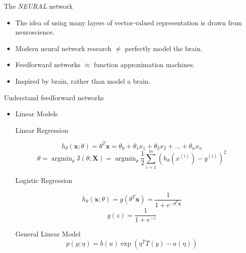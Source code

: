 \documentclass[10pt]{beamer}
\begin{document}
	\begin{frame}{The \emph{NEURAL} network}
		\begin{itemize}
			\pause
			\item The idea of using many layers of vector-valued representation is drawn from neuroscience.
			\pause
			\item Modern neural network research $\ne$ perfectly model the brain.
			\pause
			\item Feedforward networks $\approx$ function approximation machines.
			\pause
			\item Inspired by brain, rather than model a brain.
		\end{itemize}
	\end{frame}
	
	\begin{frame}{Understand feedforward networks}
		\begin{itemize}
			\pause
			\item Linear Models
			\pause
			\begin{exampleblock}{Linear Regression}
				\vspace{-2em}
				\begin{center}
					$$h_\theta(\bm{x};\theta)=\theta ^T\bm{x}=\theta_0+\theta_1x_1+\theta_2x_2+\dots+\theta_nx_n$$	
					\vspace{-2em}
					$$\theta=\mathop{\arg\min}_{\theta}\mathrm{J}(\theta;\bm{X})=\mathop{\arg\min}_{\theta}\frac{1}{2}\sum^{m}_{i=1}(h_\theta(x^{(i)})-y^{(i)})^2$$
					\vspace{-1em}
				\end{center}
			\end{exampleblock}
			\pause
			\begin{exampleblock}{Logistic Regression}
				\vspace{-1.5em}
				\begin{center}
					$$h_\theta(\bm{x};\theta)=g(\theta^T\bm{x})=\frac{1}{1+e^{-\theta^T\bm{x}}}$$
					\vspace{-1.5em}
					$$g(z)=\frac{1}{1+e^{-z}}$$
					\vspace{-1.5em}
				\end{center}
			\end{exampleblock}
			\pause
			\begin{exampleblock}{General Linear Model}
				$$p(y;\eta)=b(u)\exp(\eta^TT(y)-a(\eta))$$
			\end{exampleblock}
		\end{itemize}
		
	\end{frame}
	
\end{document}
